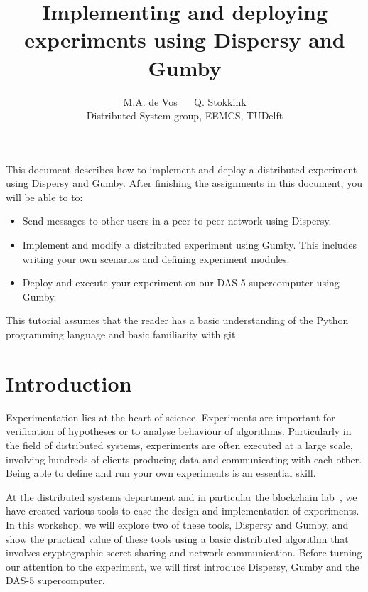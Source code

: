 \documentclass{article}
\author{
  M.A. de Vos $\quad$
  Q. Stokkink\\
  \small Distributed System group, EEMCS, TUDelft
}
\title{Implementing and deploying experiments using Dispersy and Gumby}
\begin{document}
\maketitle

This document describes how to implement and deploy a distributed experiment using Dispersy and Gumby.
After finishing the assignments in this document, you will be able to to:
\begin{itemize}
	\item Send messages to other users in a peer-to-peer network using Dispersy.
	\item Implement and modify a distributed experiment using Gumby. This includes writing your own scenarios and defining experiment modules.
	\item Deploy and execute your experiment on our DAS-5 supercomputer using Gumby.
\end{itemize}

This tutorial assumes that the reader has a basic understanding of the Python programming language and basic familiarity with git.

\section{Introduction}
Experimentation lies at the heart of science. Experiments are important for verification of hypotheses or to analyse behaviour of algorithms.
Particularly in the field of distributed systems, experiments are often executed at a large scale, involving hundreds of clients producing data and communicating with each other.
Being able to define and run your own experiments is an essential skill.

At the distributed systems department and in particular the blockchain lab~\cite{blockchainlab}, we have created various tools to ease the design and implementation of experiments. In this workshop, we will explore two of these tools, Dispersy and Gumby, and show the practical value of these tools using a basic distributed algorithm that involves cryptographic secret sharing and network communication.
Before turning our attention to the experiment, we will first introduce Dispersy, Gumby and the DAS-5 supercomputer.
\end{document}
